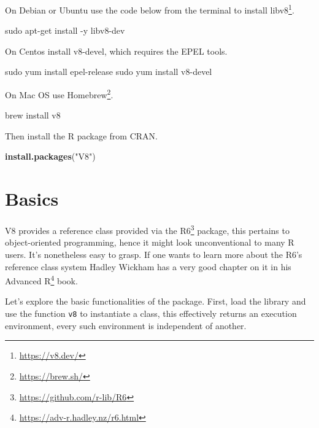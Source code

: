 \documentclass[
]{krantz}
\makeatletter
\newenvironment{Shaded}{\begin{snugshade}}{\end{snugshade}}
\newcommand{\ExtensionTok}[1]{#1}
\newcommand{\FunctionTok}[1]{\textcolor[rgb]{0,0,0}{#1}}
\newcommand{\KeywordTok}[1]{\textcolor[rgb]{0.27,0.27,0.27}{\textbf{#1}}}
\newcommand{\NormalTok}[1]{#1}
\newcommand{\StringTok}[1]{\textcolor[rgb]{0.5,0.5,0.5}{#1}}
\renewcommand{\href}[2]{#2\footnote{\url{#1}}}
\newenvironment{kframe}{%
\medskip{}
\setlength{\fboxsep}{.8em}
 \def\at@end@of@kframe{}%
 \ifinner\ifhmode%
  \def\at@end@of@kframe{\end{minipage}}%
  \begin{minipage}{\columnwidth}%
 \fi\fi%
 \def\FrameCommand##1{\hskip\@totalleftmargin \hskip-\fboxsep
 \colorbox{shadecolor}{##1}\hskip-\fboxsep
     \hskip-\linewidth \hskip-\@totalleftmargin \hskip\columnwidth}%
 \MakeFramed {\advance\hsize-\width
   \@totalleftmargin\z@ \linewidth\hsize
   \@setminipage}}%
 {\par\unskip\endMakeFramed%
 \at@end@of@kframe}
\renewenvironment{Shaded}{\begin{kframe}}{\end{kframe}}
\makeatother
\begin{document}
On Debian or Ubuntu use the code below from the terminal to install \href{https://v8.dev/}{libv8}.

\begin{Shaded}
\begin{Highlighting}[]
\FunctionTok{sudo}\NormalTok{ apt{-}get install {-}y libv8{-}dev}
\end{Highlighting}
\end{Shaded}

On Centos install v8-devel, which requires the EPEL tools.

\begin{Shaded}
\begin{Highlighting}[]
\FunctionTok{sudo}\NormalTok{ yum install epel{-}release}
\FunctionTok{sudo}\NormalTok{ yum install v8{-}devel}
\end{Highlighting}
\end{Shaded}

On Mac OS use \href{https://brew.sh/}{Homebrew}.

\begin{Shaded}
\begin{Highlighting}[]
\ExtensionTok{brew}\NormalTok{ install v8}
\end{Highlighting}
\end{Shaded}

Then install the R package from CRAN.

\begin{Shaded}
\begin{Highlighting}[]
\KeywordTok{install.packages}\NormalTok{(}\StringTok{"V8"}\NormalTok{)}
\end{Highlighting}
\end{Shaded}

\hypertarget{basics}{%
\section{Basics}\label{basics}}

V8 provides a reference class provided via the \href{https://github.com/r-lib/R6}{R6} \citep{R-R6} package, this pertains to object-oriented programming, hence it might look unconventional to many R users. It's nonetheless easy to grasp. If one wants to learn more about the R6's reference class system Hadley Wickham has a very good chapter on it in his \href{https://adv-r.hadley.nz/r6.html}{Advanced R} book.

Let's explore the basic functionalities of the package. First, load the library and use the function \texttt{v8} to instantiate a class, this effectively returns an execution environment, every such environment is independent of another.
\end{document}
